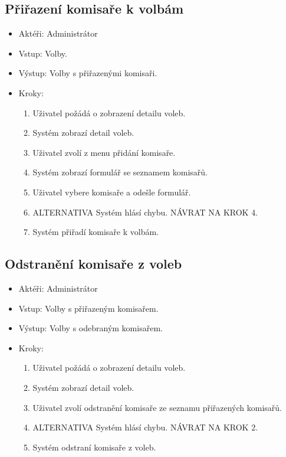 \documentclass[11pt,twoside,a4paper]{book}
\begin{document}
\subsection{Přiřazení komisaře k volbám}

\begin{itemize}
\item Aktéři: Administrátor
\item Vstup: Volby. 
\item Výstup: Volby s přiřazenými komisaři.
\item Kroky:
	\begin{enumerate}
		\item Uživatel požádá o zobrazení detailu voleb.
		\item Systém zobrazí detail voleb.
		\item Uživatel zvolí z menu přidání komisaře.
		\item Systém zobrazí formulář se seznamem komisařů.
		\item Uživatel vybere komisaře a odešle formulář.		
		\item ALTERNATIVA Systém hlásí chybu. NÁVRAT NA KROK 4.
		\item Systém přiřadí komisaře k volbám.
	\end{enumerate}
\end{itemize}

\subsection{Odstranění komisaře z voleb}

\begin{itemize}
\item Aktéři: Administrátor
\item Vstup: Volby s přiřazeným komisařem.
\item Výstup: Volby s odebraným komisařem.
\item Kroky:
	\begin{enumerate}
		\item Uživatel požádá o zobrazení detailu voleb.
		\item Systém zobrazí detail voleb.
		\item Uživatel zvolí odstranění komisaře ze seznamu přiřazených komisařů.		
		\item ALTERNATIVA Systém hlásí chybu. NÁVRAT NA KROK 2.
		\item Systém odstraní komisaře z voleb.
	\end{enumerate}
\end{itemize}
\end{document}
